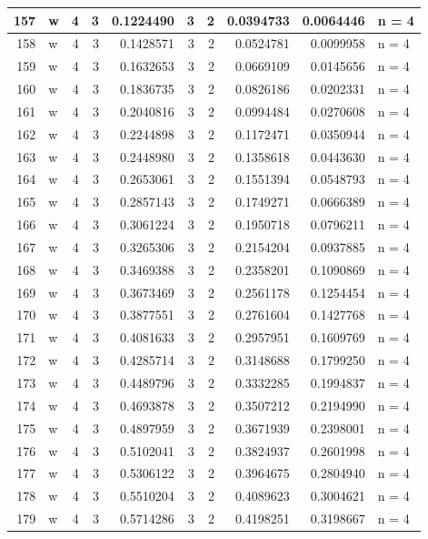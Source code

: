 \documentclass[
  letterpaper,
  DIV=11,
  numbers=noendperiod]{scrreprt}
\begin{document}
\begin{table}
\begin{tabular}[t]{r|l|r|r|r|r|r|r|r|l}
\hline
157 & w & 4 & 3 & 0.1224490 & 3 & 2 & 0.0394733 & 0.0064446 & n = 4\\
\hline
158 & w & 4 & 3 & 0.1428571 & 3 & 2 & 0.0524781 & 0.0099958 & n = 4\\
\hline
159 & w & 4 & 3 & 0.1632653 & 3 & 2 & 0.0669109 & 0.0145656 & n = 4\\
\hline
160 & w & 4 & 3 & 0.1836735 & 3 & 2 & 0.0826186 & 0.0202331 & n = 4\\
\hline
161 & w & 4 & 3 & 0.2040816 & 3 & 2 & 0.0994484 & 0.0270608 & n = 4\\
\hline
162 & w & 4 & 3 & 0.2244898 & 3 & 2 & 0.1172471 & 0.0350944 & n = 4\\
\hline
163 & w & 4 & 3 & 0.2448980 & 3 & 2 & 0.1358618 & 0.0443630 & n = 4\\
\hline
164 & w & 4 & 3 & 0.2653061 & 3 & 2 & 0.1551394 & 0.0548793 & n = 4\\
\hline
165 & w & 4 & 3 & 0.2857143 & 3 & 2 & 0.1749271 & 0.0666389 & n = 4\\
\hline
166 & w & 4 & 3 & 0.3061224 & 3 & 2 & 0.1950718 & 0.0796211 & n = 4\\
\hline
167 & w & 4 & 3 & 0.3265306 & 3 & 2 & 0.2154204 & 0.0937885 & n = 4\\
\hline
168 & w & 4 & 3 & 0.3469388 & 3 & 2 & 0.2358201 & 0.1090869 & n = 4\\
\hline
169 & w & 4 & 3 & 0.3673469 & 3 & 2 & 0.2561178 & 0.1254454 & n = 4\\
\hline
170 & w & 4 & 3 & 0.3877551 & 3 & 2 & 0.2761604 & 0.1427768 & n = 4\\
\hline
171 & w & 4 & 3 & 0.4081633 & 3 & 2 & 0.2957951 & 0.1609769 & n = 4\\
\hline
172 & w & 4 & 3 & 0.4285714 & 3 & 2 & 0.3148688 & 0.1799250 & n = 4\\
\hline
173 & w & 4 & 3 & 0.4489796 & 3 & 2 & 0.3332285 & 0.1994837 & n = 4\\
\hline
174 & w & 4 & 3 & 0.4693878 & 3 & 2 & 0.3507212 & 0.2194990 & n = 4\\
\hline
175 & w & 4 & 3 & 0.4897959 & 3 & 2 & 0.3671939 & 0.2398001 & n = 4\\
\hline
176 & w & 4 & 3 & 0.5102041 & 3 & 2 & 0.3824937 & 0.2601998 & n = 4\\
\hline
177 & w & 4 & 3 & 0.5306122 & 3 & 2 & 0.3964675 & 0.2804940 & n = 4\\
\hline
178 & w & 4 & 3 & 0.5510204 & 3 & 2 & 0.4089623 & 0.3004621 & n = 4\\
\hline
179 & w & 4 & 3 & 0.5714286 & 3 & 2 & 0.4198251 & 0.3198667 & n = 4\\

\end{tabular}
\end{table}
\end{document}
